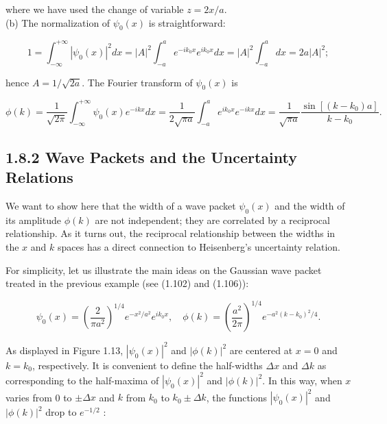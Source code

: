 \documentclass[10pt]{article}
\begin{document}
where we have used the change of variable $z=2 x / a$.\\
(b) The normalization of $\psi_{0}(x)$ is straightforward:


\begin{equation*}
1=\int_{-\infty}^{+\infty}\left|\psi_{0}(x)\right|^{2} d x=|A|^{2} \int_{-a}^{a} e^{-i k_{0} x} e^{i k_{0} x} d x=|A|^{2} \int_{-a}^{a} d x=2 a|A|^{2} ; \tag{1.108}
\end{equation*}


hence $A=1 / \sqrt{2 a}$. The Fourier transform of $\psi_{0}(x)$ is


\begin{equation*}
\phi(k)=\frac{1}{\sqrt{2 \pi}} \int_{-\infty}^{+\infty} \psi_{0}(x) e^{-i k x} d x=\frac{1}{2 \sqrt{\pi a}} \int_{-a}^{a} e^{i k_{0} x} e^{-i k x} d x=\frac{1}{\sqrt{\pi a}} \frac{\sin \left[\left(k-k_{0}\right) a\right]}{k-k_{0}} . \tag{1.109}
\end{equation*}


\subsection*{1.8.2 Wave Packets and the Uncertainty Relations}
We want to show here that the width of a wave packet $\psi_{0}(x)$ and the width of its amplitude $\phi(k)$ are not independent; they are correlated by a reciprocal relationship. As it turns out, the reciprocal relationship between the widths in the $x$ and $k$ spaces has a direct connection to Heisenberg's uncertainty relation.

For simplicity, let us illustrate the main ideas on the Gaussian wave packet treated in the previous example (see (1.102) and (1.106)):


\begin{equation*}
\psi_{0}(x)=\left(\frac{2}{\pi a^{2}}\right)^{1 / 4} e^{-x^{2} / a^{2}} e^{i k_{0} x}, \quad \phi(k)=\left(\frac{a^{2}}{2 \pi}\right)^{1 / 4} e^{-a^{2}\left(k-k_{0}\right)^{2} / 4} . \tag{1.110}
\end{equation*}


As displayed in Figure 1.13, $\left|\psi_{0}(x)\right|^{2}$ and $|\phi(k)|^{2}$ are centered at $x=0$ and $k=k_{0}$, respectively. It is convenient to define the half-widths $\Delta x$ and $\Delta k$ as corresponding to the half-maxima of $\left|\psi_{0}(x)\right|^{2}$ and $|\phi(k)|^{2}$. In this way, when $x$ varies from 0 to $\pm \Delta x$ and $k$ from $k_{0}$ to $k_{0} \pm \Delta k$, the functions $\left|\psi_{0}(x)\right|^{2}$ and $|\phi(k)|^{2}$ drop to $e^{-1 / 2}$ :
\end{document}
